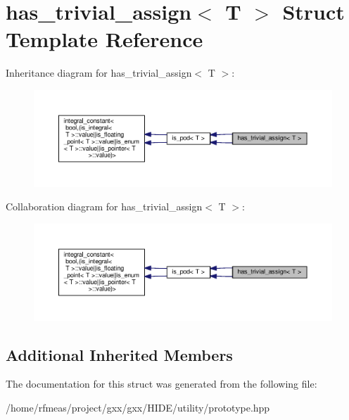 \hypertarget{structhas__trivial__assign}{}\section{has\+\_\+trivial\+\_\+assign$<$ T $>$ Struct Template Reference}
\label{structhas__trivial__assign}


Inheritance diagram for has\+\_\+trivial\+\_\+assign$<$ T $>$\+:
\nopagebreak
\begin{figure}[H]
\begin{center}
\leavevmode
\includegraphics[width=350pt]{structhas__trivial__assign__inherit__graph}
\end{center}
\end{figure}


Collaboration diagram for has\+\_\+trivial\+\_\+assign$<$ T $>$\+:
\nopagebreak
\begin{figure}[H]
\begin{center}
\leavevmode
\includegraphics[width=350pt]{structhas__trivial__assign__coll__graph}
\end{center}
\end{figure}
\subsection*{Additional Inherited Members}


The documentation for this struct was generated from the following file\+:\begin{DoxyCompactItemize}
\item 
/home/rfmeas/project/gxx/gxx/\+H\+I\+D\+E/utility/prototype.\+hpp\end{DoxyCompactItemize}

